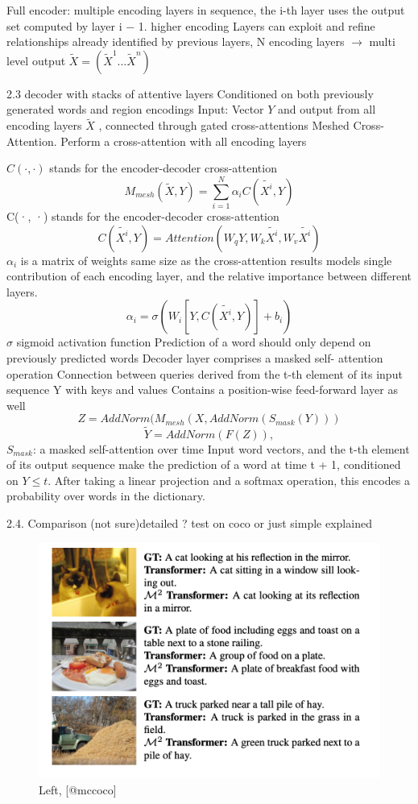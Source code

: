 \documentclass[
]{krantz}
\begin{document}
Full encoder: multiple encoding layers in sequence, the i-th layer uses the output set computed by layer i − 1.
higher encoding Layers can exploit and refine relationships already identified by previous layers,
N encoding layers \(\rightarrow\) multi level output \(\tilde{X} = (\tilde{X}^1 \dots \tilde{X}^n)\)

2.3 decoder with stacks of attentive layers
Conditioned on both previously generated words and region encodings
Input: Vector \(Y\) and output from all encoding layers \(\tilde{X}\) , connected through gated cross-attentions
Meshed Cross-Attention.
Perform a cross-attention with all encoding layers

\(C(·, ·)\) stands for the encoder-decoder cross-attention
\[M_{mesh}(\tilde{X}, Y) =\sum_{i = 1}^{N}\alpha_i C(\tilde{X^i}, Y) \]
C(·, ·) stands for the encoder-decoder cross-attention
\[ C(\tilde{X^i}, Y) = Attention(W_q Y, W_k \tilde{X^i}, W_v \tilde{X^i}) \]
\(\alpha_i\) is a matrix of weights same size as the cross-attention results
models single contribution of each encoding layer, and the relative importance between different layers.
\[\alpha_i = \sigma(W_i [Y,C(\tilde{X^i}, Y)]+b_i)\]
\(\sigma\) sigmoid activation function
Prediction of a word should only depend on previously predicted words
Decoder layer comprises a masked self- attention operation
Connection between queries derived from the t-th element of its input sequence Y with keys and values
Contains a position-wise feed-forward layer as well
\[Z = AddNorm(M_{mesh}(X,AddNorm(S_{mask}(Y )))\]
\[\tilde{Y} = AddNorm(F(Z)),\]
\(S_{mask}\): a masked self-attention over time
Input word vectors, and the t-th element of its output sequence make the prediction of a word at time t + 1, conditioned on \(Y≤t\). After taking a linear projection and a softmax operation, this encodes a probability over words in the dictionary.

2.4. Comparison
(not sure)detailed ? test on coco
or just simple explained

\begin{figure}

{\centering \includegraphics[width=1\linewidth]{figures/02-chapter2/2.1 m2 example} 

}

\caption{Left, [@mccoco]}\label{fig:unnamed-chunk-5}
\end{figure}
\end{document}
